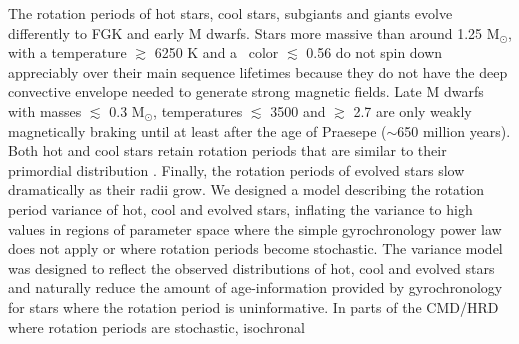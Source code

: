 The rotation periods of hot stars, cool stars, subgiants and giants evolve
differently to FGK and early M dwarfs.
Stars more massive than around 1.25 M$_\odot$, with a temperature $\gtrsim$
6250 K and a \gcolor\ color $\lesssim$ 0.56 do not spin down appreciably over
their main sequence lifetimes because they do not have the deep convective
envelope needed to generate strong magnetic fields.
Late M dwarfs with masses $\lesssim$ 0.3 M$_\odot$, temperatures $\lesssim$
3500 and \gcolor $\gtrsim$ 2.7 are only weakly magnetically braking until at
least after the age of Praesepe ($\sim$650 million years).
Both hot and cool stars retain rotation periods that are similar to their
primordial distribution \citep[see \eg][]{matt2012, somers2017}.
Finally, the rotation periods of evolved stars slow dramatically as their
radii grow.
We designed a model describing the rotation period variance of hot, cool and
evolved stars, inflating the variance to high values in regions of parameter
space where the simple gyrochronology power law does not apply or where
rotation periods become stochastic.
The variance model was designed to reflect the observed distributions of hot,
cool and evolved stars and naturally reduce the amount of age-information
provided by gyrochronology for stars where the rotation period is
uninformative.
In parts of the CMD/HRD where rotation periods are stochastic, isochronal
